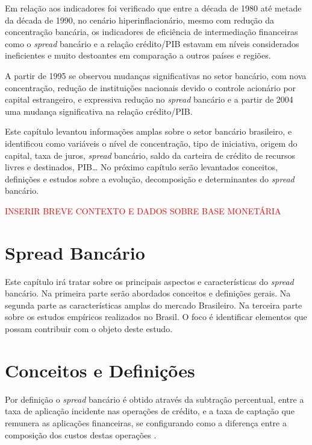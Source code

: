 \documentclass[12pt,openright,oneside,a4paper,chapter=TITLE,section=TITLE,subsection=Title,english,french,spanish,portugues,sumario=tradicional]{04-class-files/abntex2}
\begin{document}
Em relação aos indicadores foi verificado que entre a década de 1980 até metade
da década de 1990, no cenário hiperinflacionário, mesmo com redução da
concentração bancária, os indicadores de eficiência de intermediação
financeiras como o \emph{spread} bancário e a relação crédito/PIB estavam em níveis
considerados ineficientes e muito destoantes em comparação a outros países e
regiões.

A partir de 1995 se observou mudanças significativas no setor bancário, com
nova concentração, redução de instituições nacionais devido o controle
acionário por capital estrangeiro, e expressiva redução no \emph{spread} bancário e
a partir de 2004 uma mudança significativa na relação crédito/PIB.

Este capítulo levantou informações amplas sobre o setor bancário brasileiro, e
identificou como variáveis o nível de concentração, tipo de iniciativa, origem
do capital, taxa de juros, \emph{spread} bancário, saldo da carteira de crédito de
recursos livres e destinados, PIB\ldots{} No próximo capítulo serão levantados
conceitos, definições e estudos sobre a evolução, decomposição e determinantes
do \emph{spread} bancário.

\textcolor{red}{INSERIR BREVE CONTEXTO E DADOS SOBRE BASE MONETÁRIA}

\textual
\pagestyle{simple}

\section{Spread Bancário}

Este capítulo irá tratar sobre os principais aspectos e características do
\emph{spread} bancário. Na primeira parte serão abordados conceitos e definições
gerais. Na segunda parte as características amplas do mercado Brasileiro. Na
terceira parte sobre os estudos empíricos realizados no Brasil. O foco é
identificar elementos que possam contribuir com o objeto deste estudo.

\section{Conceitos e Definições}

Por definição o \emph{spread} bancário é obtido através da subtração percentual,
entre a taxa de aplicação incidente nas operações de crédito, e a taxa de
captação que remunera as aplicações financeiras, se configurando como a
diferença entre a composição dos custos destas operações \cite{BCB:2000}.
\end{document}
